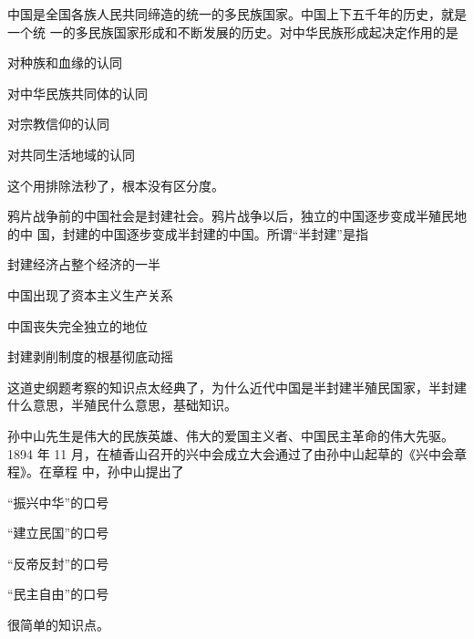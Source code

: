 \documentclass[lang=cn,blue,10pt,scheme=chinese,twocol]{zznote}
\begin{document}
\begin{exercise}中国是全国各族人民共同缔造的统一的多民族国家。中国上下五千年的历史，就是一个统 一的多民族国家形成和不断发展的历史。对中华民族形成起决定作用的是
	\begin{choice}
		\item 对种族和血缘的认同
		\item 对中华民族共同体的认同
		\item 对宗教信仰的认同
		\item 对共同生活地域的认同
	\end{choice}
\end{exercise}
\begin{solution}
	这个用排除法秒了，根本没有区分度。
\end{solution}


\begin{exercise}鸦片战争前的中国社会是封建社会。鸦片战争以后，独立的中国逐步变成半殖民地的中 国，封建的中国逐步变成半封建的中国。所谓“半封建”是指
	\begin{choice}
		\item 封建经济占整个经济的一半
		\item 中国出现了资本主义生产关系
		\item 中国丧失完全独立的地位
		\item 封建剥削制度的根基彻底动摇
	\end{choice}
\end{exercise}
\begin{solution}
	这道史纲题考察的知识点太经典了，为什么近代中国是半封建半殖民国家，半封建什么意思，半殖民什么意思，基础知识。
\end{solution}


\begin{exercise}孙中山先生是伟大的民族英雄、伟大的爱国主义者、中国民主革命的伟大先驱。1894 年 11 月，在植香山召开的兴中会成立大会通过了由孙中山起草的《兴中会章程》。在章程 中，孙中山提出了
	\begin{choice}
		\item “振兴中华”的口号
		\item “建立民国”的口号
		\item “反帝反封”的口号
		\item “民主自由”的口号
	\end{choice}
\end{exercise}
\begin{solution}
	很简单的知识点。
\end{solution}
\end{document}
